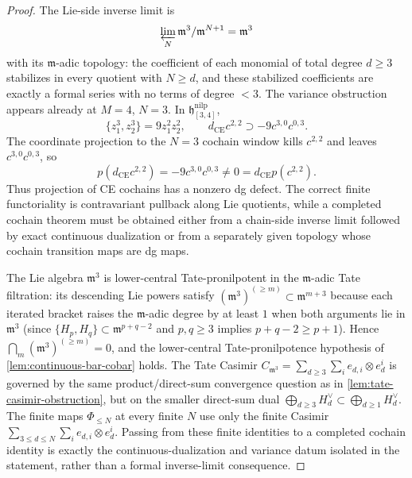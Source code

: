 \begin{proof}
The Lie-side inverse limit is
\[
  \varprojlim_N\mathfrak m^3/\mathfrak m^{N+1}=\mathfrak m^3
\]
with its \(\mathfrak m\)-adic topology: the coefficient of each
monomial of total degree \(d\ge3\) stabilizes in every quotient with
\(N\ge d\), and these stabilized coefficients are exactly a formal
series with no terms of degree \(<3\).  The variance obstruction appears already at
\(M=4\), \(N=3\).  In \(\mathfrak h^{\mathrm{nilp}}_{[3,4]}\),
\[
  \{z_1^3,z_2^3\}=9z_1^2z_2^2,
  \qquad
  d_{\mathrm{CE}}c^{2,2}\supset -9c^{3,0}c^{0,3}.
  \]
The coordinate projection to the \(N=3\) cochain window kills
\(c^{2,2}\) and leaves \(c^{3,0}c^{0,3}\), so
\[
  p(d_{\mathrm{CE}}c^{2,2})=-9c^{3,0}c^{0,3}
  \neq0=d_{\mathrm{CE}}p(c^{2,2}).
  \]
Thus projection of CE cochains has a nonzero dg defect.  The correct finite
functoriality is contravariant pullback along Lie quotients, while a
completed cochain theorem must be obtained either from a chain-side
inverse limit followed by exact continuous dualization or from a
separately given topology whose cochain transition maps are dg maps.

The Lie algebra $\mathfrak m^3$ is lower-central Tate-pronilpotent in the
$\mathfrak m$-adic Tate filtration: its descending Lie powers satisfy
$(\mathfrak m^3)^{(\geq m)}\subset\mathfrak m^{m+3}$ because each
iterated bracket raises the $\mathfrak m$-adic degree by at least
$1$ when both arguments lie in $\mathfrak m^3$ (since
$\{H_p,H_q\}\subset\mathfrak m^{p+q-2}$ and $p,q\geq 3$ implies
$p+q-2\geq p+1$). Hence $\bigcap_m(\mathfrak m^3)^{(\geq m)}=0$,
	and the lower-central Tate-pronilpotence hypothesis of
\ref{lem:continuous-bar-cobar} holds. The Tate Casimir
$C_{\mathfrak m^3}=\sum_{d\geq 3}\sum_i e_{d,i}\otimes e_d^i$
is governed by the same product/direct-sum convergence question
as in \ref{lem:tate-casimir-obstruction}, but on the smaller
	direct-sum dual $\bigoplus_{d\geq 3}H_d^\vee\subset
\bigoplus_{d\geq 1}H_d^\vee$.  The finite maps
\(\Phi_{\leq N}\) at every finite \(N\) use only the finite Casimir
\(\sum_{3\leq d\leq N}\sum_i e_{d,i}\otimes e_d^i\).  Passing from these
finite identities to a completed cochain identity is exactly the
continuous-dualization and variance datum isolated in the statement, rather
than a formal inverse-limit consequence.
\end{proof}

